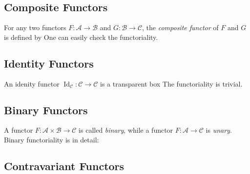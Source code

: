 \subsection{Composite Functors}

For any two functors $F : \mathcal{A} \to \mathcal{B}$ and $G : \mathcal{B} \to \mathcal{C}$, %
the \textit{composite functor} of $F$ and $G$
is defined by
One can easily check the functoriality.


\subsection{Identity Functors}

An idenity functor $\operatorname{Id}_{\mathcal{C}} : \mathcal{C} \to \mathcal{C}$ is a transparent box
The functoriality is trivial.


\subsection{Binary Functors}

A functor $F : \mathcal{A} \times \mathcal{B} \to \mathcal{C}$ is called \textit{binary}, while
a functor $F : \mathcal{A} \to \mathcal{C}$ is \textit{unary}.
Binary functoriality is in detail:

\subsection{Contravariant Functors}

